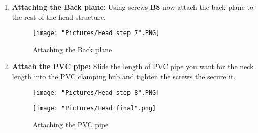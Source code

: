 \documentclass[12pt]{article}
\begin{document}
\begin{enumerate}
	\item \textbf{Attaching the Back plane:} Using screws \textbf{B8} now attach the back plane to the rest of the head structure. 

\begin{figure}[H]
	\centering
	\texttt{[image: "Pictures/Head step 7".PNG]}
	\caption{Attaching the Back plane}
\end{figure}

	\item \textbf{Attach the PVC pipe:} Slide the length of PVC pipe you want for the neck length into the PVC clamping hub and tighten the screws the secure it.

\begin{figure}[H]
	\centering
  	\begin{minipage}[b]{0.45\textwidth}
		\texttt{[image: "Pictures/Head step 8".PNG]}
  	\end{minipage}
  	\hfill
  	\begin{minipage}[b]{0.45\textwidth}
    		\texttt{[image: "Pictures/Head final".png]}
  	\end{minipage}
  	\caption{Attaching the PVC pipe}
  	\label{pvc}
\end{figure}

\end{enumerate}
\end{document}
